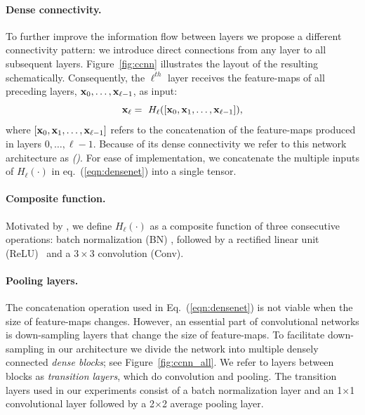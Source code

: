 \vspace{-2 ex}
\paragraph{Dense connectivity.}
To further improve the information flow between layers we propose a different connectivity pattern: we introduce direct connections from any layer to all subsequent layers. Figure~\ref{fig:ccnn} illustrates the layout of the resulting \methodnameshort{} schematically.
Consequently, the $\ell^{th}$ layer receives the feature-maps of all preceding layers, $\mathbf{x}_0,\dots,\mathbf{x}_{\ell-1}$, as input:
\vspace{-1ex}
\begin{equation}
\vspace{-1ex}
\bx_{\ell} = \ H_\ell([\bx_0, \bx_1,\ldots, \bx_{\ell-1}]),
\label{eqn:densenet}
\end{equation}
where $[\mathbf{x}_0, \mathbf{x}_1,\ldots, \mathbf{x}_{\ell-1}]$ refers to the concatenation of the feature-maps produced in layers $0,\dots,\ell-1$. Because of its dense connectivity we refer to this network architecture as \emph{\methodnamecap{} (\methodnameshort{})}.
For ease of implementation, we concatenate the multiple inputs of $H_\ell(\cdot)$ in eq.~(\ref{eqn:densenet}) into a single tensor.



\vspace{-2 ex}
\paragraph{Composite function.}
Motivated by \cite{identity-mappings}, we define $H_\ell(\cdot)$ as a composite function of three consecutive operations: batch normalization (BN) \cite{batch-norm}, followed by a rectified linear unit (ReLU)~\cite{relu} and a $3\times 3$ convolution (Conv).




\vspace{-2 ex}
\paragraph{Pooling layers.}
The concatenation operation used in Eq.~(\ref{eqn:densenet}) is not viable when the size of feature-maps changes. However, an essential part of convolutional networks is down-sampling layers that change the size of feature-maps.  To facilitate down-sampling in our architecture we divide the network into multiple densely connected \emph{dense blocks}; see Figure~\ref{fig:ccnn_all}. We refer to layers between blocks as \emph{transition layers}, which do convolution and pooling. The transition layers used in our experiments consist of a batch normalization layer and an 1$\times$1 convolutional layer followed by a 2$\times$2 average pooling layer.

